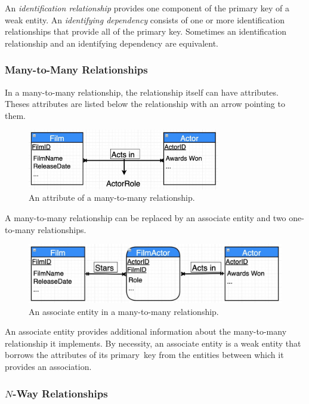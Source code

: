 An \emph{identification relationship} provides one component of the primary key of a weak entity.
An \emph{identifying dependency} consists of one or more identification relationships that provide all of the primary key.
Sometimes an identification relationship and an identifying dependency are equivalent.

\subsubsection{Many-to-Many Relationships}

In a many-to-many relationship, the relationship itself can have attributes.
Theses attributes are listed below the relationship with an arrow pointing to them.

\begin{figure}[htp]
  \centering
  \includegraphics[width=0.75\textwidth]{unit-1/figures/relationship-attribute.jpg}
  \caption*{An attribute of a many-to-many relationship.}
\end{figure}

A many-to-many relationship can be replaced by an associate entity and two one-to-many relationships.

\begin{figure}[htp]
  \centering
  \includegraphics[width=\textwidth]{unit-1/figures/associate-entity.jpg}
  \caption*{An associate entity in a many-to-many relationship.}
\end{figure}

An associate entity provides additional information about the many-to-many relationship it implements.
By necessity, an associate entity is a weak entity that borrows the attributes of its primary~key from the entities between which it provides an association.

\subsubsection{\texorpdfstring{\( N \)}{N}-Way Relationships}

